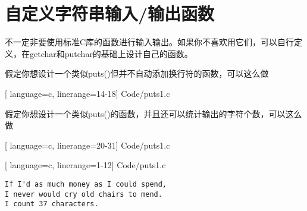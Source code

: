 \section{自定义字符串输入/输出函数}

\begin{frame}[fragile]\ft{\secname} 
不一定非要使用标准C库的函数进行输入输出。如果你不喜欢用它们，可以自行定义，在getchar和putchar的基础上设计自己的函数。
\end{frame}




\begin{frame}[fragile]\ft{\secname} 
假定你想设计一个类似{\tf puts()}但并不自动添加换行符的函数，可以这么做

[
 language=c,
 linerange={14-18}]
{Code/puts1.c}
\end{frame}

\begin{frame}[fragile]\ft{\secname} 
假定你想设计一个类似{\tf puts()}的函数，并且还可以统计输出的字符个数，可以这么做

[
 language=c,
 linerange={20-31}]
{Code/puts1.c}
\end{frame}

\begin{frame}[fragile]\ft{\secname} 

[
 language=c,
 linerange={1-12}]
{Code/puts1.c}
\end{frame}

\begin{frame}[fragile]\ft{\secname}
\begin{lstlisting}[backgroundcolor=\color{blue!20}]
If I'd as much money as I could spend,
I never would cry old chairs to mend.
I count 37 characters.
\end{lstlisting}

\end{frame}

